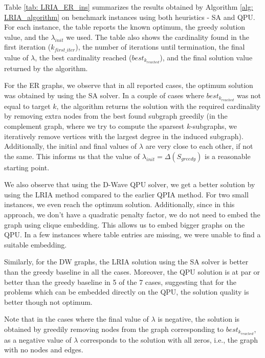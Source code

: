 \documentclass{article}
\newcommand{\Omkar}[1]{{\color{teal}#1}}
\begin{document}
\begin{landscape}
\end{landscape}


Table \ref{tab: LRIA_ER_ins} summarizes the results obtained by Algorithm \ref{alg: LRIA_algorithm} on benchmark instances using both heuristics - SA and QPU. For each instance, the table reports the known optimum, the greedy solution value, and the $\lambda_{init}$ we used. The table also shows the cardinality found in the first iteration ($k_{first\_iter}$), the number of iterations until termination, the final value of $\lambda$, the best cardinality reached ($best_{k_{reached}}$), and the final solution value returned by the algorithm.

For the  ER  graphs, we observe that in all reported cases,  the optimum solution was obtained by using the SA solver. In a couple of cases where $best_{k_{reached}}$ was not equal to target $k$, the algorithm returns the solution with the required cardinality by removing extra nodes from the best found subgraph greedily (in the complement graph, where we try to compute the sparsest $k$-subgraphs, we iteratively remove vertices with the largest degree in the induced subgraph).  Additionally, the initial and final values of $\lambda$ are very close to each other, if not the same. This informs us that the value of $\lambda_{init} = \Delta(S_{greedy})$ is a reasonable starting point.


We also observe that using the D-Wave QPU solver, we get a better solution by using the LRIA method compared to the earlier QPIA method. For two small instances, we even reach the optimum solution. Additionally, since in this approach, we don't have a quadratic penalty factor, we do not need to embed the graph using clique embedding. This allows us to embed bigger graphs on the QPU. In a few instances where table entries are missing, we were unable to find a suitable embedding.

Similarly, for the  DW graphs, the LRIA solution using the SA solver is better than the greedy baseline in all the cases. Moreover, the QPU solution is at par or better than the greedy baseline in 5 of the 7 cases, suggesting that for the problems which can be embedded directly on the QPU, the solution quality is better though not optimum.

Note that in the cases where the final value of $\lambda$ is negative, the solution is obtained by greedily removing nodes from the graph corresponding to $best_{k_{reached}}$, as a negative value of $\lambda$ corresponds to the solution with all zeros, i.e., the graph with no nodes and edges.
\end{document}
